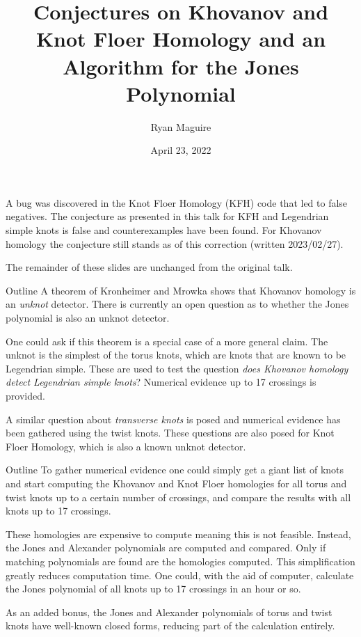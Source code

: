 \documentclass{beamer}
\title{Conjectures on Khovanov and Knot Floer Homology and an Algorithm
       for the Jones Polynomial}
\author{Ryan Maguire}
\date{April 23, 2022}
\begin{document}
    \maketitle
    \begin{frame}{\textbf{\color{red}{Corrections}}}
        A bug was discovered in the Knot Floer Homology (KFH) code that led to
        false negatives. The conjecture as presented in this talk for
        KFH and Legendrian simple knots is false and counterexamples have been
        found. For Khovanov homology the conjecture still stands as of this
        correction (written 2023/02/27).
        \par\hfill\par
        The remainder of these slides are unchanged from the original talk.
    \end{frame}
    \begin{frame}{Outline}
        A theorem of Kronheimer and Mrowka shows that Khovanov homology is
        an \textit{unknot} detector. There is currently an open question as to
        whether the Jones polynomial is also an unknot detector.
        \par\hfill\par
        One could ask if this theorem is a special case of a more general claim.
        The unknot is the simplest of the torus knots, which are knots that are
        known to be Legendrian simple. These are used to test the question
        \textit{does Khovanov homology detect Legendrian simple knots}?
        Numerical evidence up to 17 crossings is provided.
        \par\hfill\par
        A similar question about \textit{transverse knots} is posed and
        numerical evidence has been gathered using the twist knots. These
        questions are also posed for Knot Floer Homology, which is also a
        known unknot detector.
    \end{frame}
    \begin{frame}{Outline}
        To gather numerical evidence one could simply get a giant list of knots
        and start computing the Khovanov and Knot Floer homologies for all
        torus and twist knots up to a certain number of crossings, and compare
        the results with all knots up to 17 crossings.
        \par\hfill\par
        These homologies are expensive to compute meaning this is not feasible.
        Instead, the Jones and Alexander polynomials are computed and compared.
        Only if matching polynomials are found are the
        homologies computed. This simplification greatly reduces computation
        time. One could, with the aid of computer, calculate the Jones
        polynomial of all knots up to 17 crossings in an hour or so.
        \par\hfill\par
        As an added bonus, the Jones and Alexander polynomials of
        torus and twist knots have well-known closed forms, reducing part of the
        calculation entirely.
    \end{frame}
\end{document}
